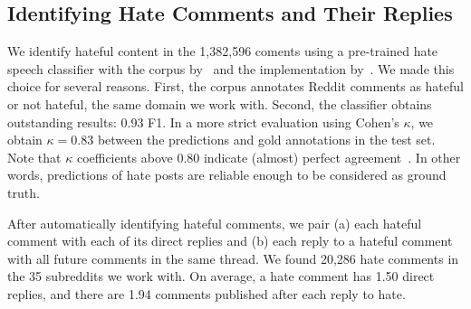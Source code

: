 \documentclass[11pt]{article}
\begin{document}
\subsection{Identifying Hate Comments and Their Replies}
\label{ss:identify}
We identify hateful content in the 1,382,596 coments using a pre-trained hate speech classifier \cite{DBLP:journals/corr/abs-1907-11692} with the corpus by~\citet{qian-etal-2019-benchmark}
and
the implementation by~\citet{phang2020jiant}.
We made this choice for several reasons.
First, the corpus annotates Reddit comments as hateful or not hateful, the same domain we work with.
Second, the classifier obtains outstanding results: 0.93 F1.
In a more strict evaluation using Cohen's $\kappa$, we obtain $\kappa=0.83$ between the predictions and gold annotations in the test set.
Note that $\kappa$ coefficients above $0.80$ indicate (almost) perfect agreement~\cite{artstein2008inter}.
In other words, predictions of hate posts are reliable enough to be considered as ground truth.

\begin{comment}
\begin{table}
\small
\begin{tabular}{lrrr}
\toprule
& \#hate & Avg. replies & Avg. hate after \\ \midrule
subreddit1 & 0 & 0 & 0 \\
\\ \bottomrule
\end{tabular}
\caption{Number of hate comments in each subreddit we work with,
average number of replies to each hate comment,
and average number of comments published after the reply.
Summary sentence. Summary sentence. Summary sentence. Summary sentence.}
\label{t:counts}
\end{table}
\end{comment}

After automatically identifying hateful comments, we pair
(a) each hateful comment with each of its direct replies
and
(b) each reply to a hateful comment with all future comments in the same thread.
We found 20,286  hate comments in the 35 subreddits we work with.
On average, a hate comment has 1.50 direct replies,
and there are 1.94 comments published after each reply to hate.

\end{document}
